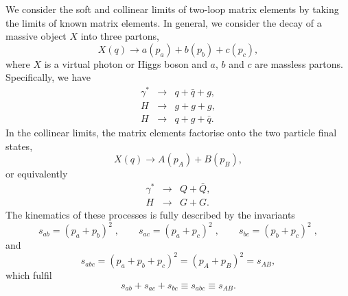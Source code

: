 \documentclass[paper,notoc,nohyper]{JHEP3}
\def\sAB{s_{AB}}
\def\sabc{s_{abc}}
\def\sab{s_{ab}}
\def\sac{s_{ac}}
\def\sbc{s_{bc}}
\begin{document}
We consider the soft and collinear limits of two-loop matrix elements 
by taking the limits of known matrix elements.
In general, we consider the decay of a massive object $X$ into three partons,
\begin{equation}
X (q) \longrightarrow a(p_a) + b (p_b) + c(p_c),
\end{equation}
where $X$ is a virtual photon or Higgs boson and $a$, $b$ and  $c$ are massless partons.
Specifically, we have 
\begin{eqnarray}
\label{eq:gamma3}
\gamma^*  &\longrightarrow& q  + \bar q   + g ,\\
\label{eq:Hggg}
H &\longrightarrow& g  + g   + g ,\\
\label{eq:Hqqg}
H &\longrightarrow& q    + g + \bar q .
\end{eqnarray}
In the collinear limits, the matrix elements factorise onto the two particle final states,
\begin{equation}
X (q) \longrightarrow A(p_A) + B (p_B),
\end{equation}
or equivalently
\begin{eqnarray}
\label{eq:gamma2}
\gamma^*   &\longrightarrow& Q  + \bar Q,\\
\label{eq:Hgg}
H &\longrightarrow& G + G  .
\end{eqnarray}
The kinematics of these processes is fully described by the invariants
\begin{equation}
\sab = (p_a+p_b)^2\;, \qquad \sac = (p_a+p_c)^2\;, \qquad 
\sbc = (p_b+p_c)^2\;,
\end{equation}
and
\begin{equation}
\sabc = (p_a+p_b+p_c)^2 = (p_A+p_B)^2 = \sAB,
\end{equation}
which fulfil
\begin{equation}
\sab + \sac + \sbc \equiv \sabc \equiv \sAB.
\end{equation}
\end{document}
